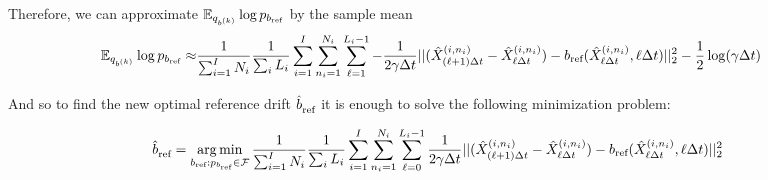 Therefore, we can approximate $\E_{\bridge_{\drift^{(\iteralgo)}}}\log \refden_{\refdrift}$ by the sample mean
\begin{equation}
\label{eq:second_proj_L2}
\begin{aligned}
    \E_{\bridge_{\drift^{(\iteralgo)}}}\log \refden_{\refdrift} \approx& \frac{1}{\sum_{\timeidx=1}^{\totsteps}N_{\timeidx}}\frac{1}{\sum_{\timeidx} L_{\timeidx}}\sum_{\timeidx=1}^{\totsteps}\sum_{n_{\timeidx}=1}^{N_{\timeidx}} \sum_{\discstep=1}^{\totdiscstep_{\timeidx}-1} -\frac{1}{2\volatility\Delta\timet} ||(\simulatedresponseat{(\ell+1) \Delta \timet}^{ (\timeidx,\sampleidx_{\timeidx}) }-\simulatedresponseat{\ell \Delta \timet}^{ (\timeidx,\sampleidx_{\timeidx}) })-\refdrift(\simulatedresponseat{\ell \Delta \timet}^{ (\timeidx,\sampleidx_{\timeidx}) }, \discstep\Delta\timet)||_2^2 -\frac{1}{2}\log(\volatility \Delta\timet)
\end{aligned}
\end{equation}


And so to find the new optimal reference drift $\estimaterefdriftstep{}$ it is enough to solve the following minimization problem: 


\begin{align*}
    \estimaterefdriftstep{}=\argmin_{\refdrift: \refden_{\refdrift}\in\modelfamily} \frac{1}{\sum_{\timeidx=1}^{\totsteps}N_{\timeidx}}\frac{1}{\sum_{\timeidx} L_{\timeidx}}\sum_{\timeidx=1}^{\totsteps}\sum_{n_{\timeidx}=1}^{N_{\timeidx}} \sum_{\discstep=0}^{\totdiscstep_{\timeidx}-1} \frac{1}{2\volatility\Delta\timet} ||(\simulatedresponseat{(\ell+1) \Delta \timet}^{ (\timeidx,\sampleidx_{\timeidx}) }-\simulatedresponseat{\ell \Delta \timet}^{ (\timeidx,\sampleidx_{\timeidx}) })-\refdrift(\simulatedresponseat{\ell \Delta \timet}^{ (\timeidx,\sampleidx_{\timeidx}) }, \discstep\Delta\timet)||_2^2
\end{align*}


